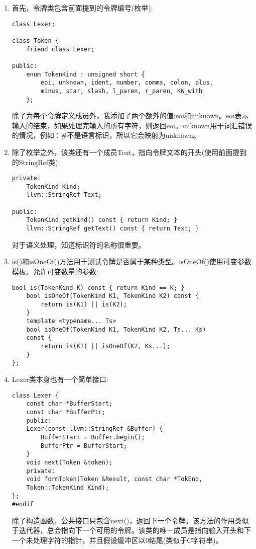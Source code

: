\begin{enumerate}
\item 首先，令牌类包含前面提到的令牌编号(枚举):
\begin{lstlisting}[caption={}]
class Lexer;

class Token {
	friend class Lexer;
	
public:
	enum TokenKind : unsigned short {
		eoi, unknown, ident, number, comma, colon, plus,
		minus, star, slash, l_paren, r_paren, KW_with
	};
\end{lstlisting}
除了为每个令牌定义成员外，我添加了两个额外的值:eoi和unknown。eoi表示输入的结束，如果处理完输入的所有字符，则返回eoi。unknown用于词汇错误的情况，例如：\#不是语言标识，所以它会映射为unknown。 
	
\item 除了枚举之外，该类还有一个成员Text，指向令牌文本的开头(使用前面提到的StringRef类):
\begin{lstlisting}[caption={}]
private:
	TokenKind Kind;
	llvm::StringRef Text;

public:
	TokenKind getKind() const { return Kind; }
	llvm::StringRef getText() const { return Text; }
\end{lstlisting}
对于语义处理，知道标识符的名称很重要。
	
\item is()和isOneOf()方法用于测试令牌是否属于某种类型。isOneOf()使用可变参数模板，允许可变数量的参数:
\begin{lstlisting}[caption={}]
	bool is(TokenKind K) const { return Kind == K; }
	bool isOneOf(TokenKind K1, TokenKind K2) const {
		return is(K1) || is(K2);
	}
	template <typename... Ts>
	bool isOneOf(TokenKind K1, TokenKind K2, Ts... Ks)
	const {
		return is(K1) || isOneOf(K2, Ks...);
	}
};
\end{lstlisting}

\item Lexer类本身也有一个简单接口:
\begin{lstlisting}[caption={}]
class Lexer {
	const char *BufferStart;
	const char *BufferPtr;
	public:
	Lexer(const llvm::StringRef &Buffer) {
		BufferStart = Buffer.begin();
		BufferPtr = BufferStart;
	}
	void next(Token &token);
	private:
	void formToken(Token &Result, const char *TokEnd,
	Token::TokenKind Kind);
};
#endif
\end{lstlisting}
除了构造函数，公共接口只包含next()，返回下一个令牌。该方法的作用类似于迭代器，总会指向下一个可用的令牌。该类的唯一成员是指向输入开头和下一个未处理字符的指针，并且假设缓冲区以0结尾(类似于C字符串)。
	

\end{enumerate}
